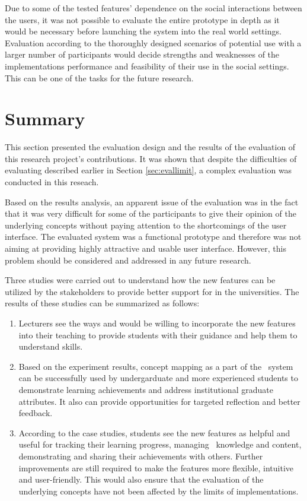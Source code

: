 Due to some of the tested features' dependence on the social interactions
between the users, it was not possible to evaluate the entire prototype in depth
as it would be necessary before launching the system into the real world
settings. Evaluation according to the thoroughly designed scenarios of potential
use with a larger number of participants would decide strengths and weaknesses
of the implementations performance and feasibility of their use in the social
settings. This can be one of the tasks for the future research.

\section{Summary}

This section presented the evaluation design and the results of the evaluation
of this research project's contributions. It was shown that despite the
difficulties of evaluating \LLLs described earlier in Section
\ref{sec:evallimit}, a complex evaluation was conducted in this reseach.

Based on the results analysis, an apparent issue of the evaluation was in the
fact that it was very difficult for some of the participants to give their
opinion of the underlying concepts without paying attention to the shortcomings
of the user interface. The evaluated system was a functional prototype and
therefore was not aiming at providing highly attractive and usable user
interface. However, this problem should be considered and addressed in any
future research.

Three studies were carried out to understand how the new features can be
utilized by the stakeholders to provide better support for \LLLs in the
universities. The results of these studies can be summarized as follows:

\begin{enumerate}
  \item Lecturers see the ways and would be willing to incorporate the new
  features into their teaching to provide students with their guidance and help
  them to understand \LLLs skills.
  \item Based on the experiment results, concept mapping as a part of the
  \ep~system can be successfully used by undergarduate and more experienced
  students to demonstrate learning achievements and address institutional
  graduate attributes. It also can provide opportunities for targeted reflection
  and better feedback.
  \item According to the case studies, students see the new features as
  helpful and useful for tracking their learning progress, managing
  \ep~knowledge and content, demonstrating and sharing their achievements with
  others. Further improvements are still required to make the features more
  flexible, intuitive and user-friendly. This would also ensure that the
  evaluation of the underlying concepts have not been affected by the limits of
  implementations.
\end{enumerate} 


